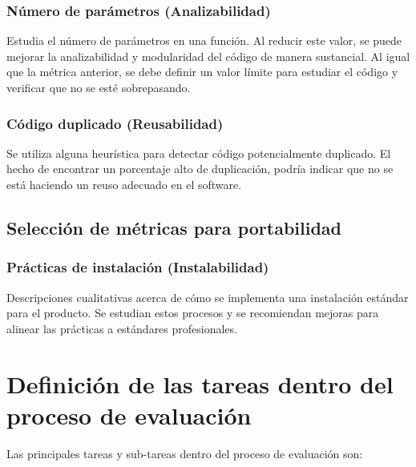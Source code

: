 \subsubsection{Número de parámetros (Analizabilidad)}
Estudia el número de parámetros en una función.
Al reducir este valor, se puede mejorar la analizabilidad y modularidad del código de manera sustancial.
Al igual que la métrica anterior, se debe definir un valor límite para estudiar el código y verificar que
no se esté sobrepasando.

\subsubsection{Código duplicado (Reusabilidad)}

Se utiliza alguna heurística para detectar código potencialmente duplicado.
El hecho de encontrar un porcentaje alto de duplicación, podría indicar que no se está haciendo un reuso 
adecuado en el software.

\subsection{Selección de métricas para portabilidad}

\subsubsection{Prácticas de instalación (Instalabilidad)}

Descripciones cualitativas acerca de cómo se implementa una instalación estándar para el producto. 
Se estudian estos procesos y se recomiendan mejoras para alinear las prácticas a estándares profesionales.

\section{Definición de las tareas dentro del proceso de evaluación}

Las principales tareas y sub-tareas dentro del proceso de evaluación son:

